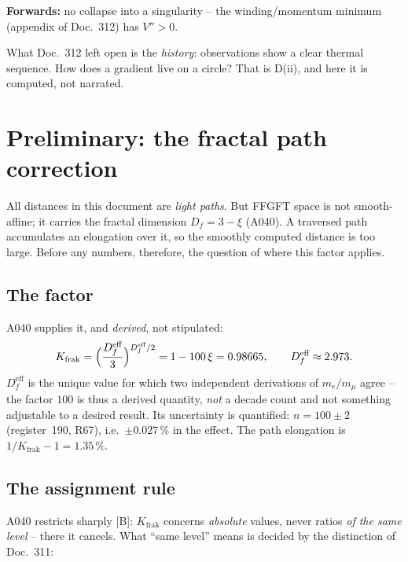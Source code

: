 \documentclass[11pt]{report}
\begin{document}
\textbf{Forwards:} no collapse into a singularity -- the
winding/momentum minimum (appendix of Doc.~312) has $V'' > 0$.

What Doc.~312 left open is the \emph{history}: observations show a
clear thermal sequence. How does a gradient live on a circle? That
is D(ii), and here it is computed, not narrated.

\chapter{Preliminary: the fractal path correction}

All distances in this document are \emph{light paths}. But FFGFT
space is not smooth-affine; it carries the fractal dimension
$D_f = 3-\xi$ (A040). A traversed path accumulates an elongation
over it, so the smoothly computed distance is too large. Before
any numbers, therefore, the question of where this factor applies.

\section{The factor}

A040 supplies it, and \emph{derived}, not stipulated:
\begin{equation}
  K_\text{frak} = \Bigl(\frac{D_f^\text{eff}}{3}\Bigr)^{D_f^\text{eff}/2}
  = 1-100\,\xi = 0.98665,
  \qquad D_f^\text{eff} \approx 2.973 .
\end{equation}
$D_f^\text{eff}$ is the unique value for which two independent
derivations of $m_e/m_\mu$ agree -- the factor $100$ is thus a
derived quantity, \emph{not} a decade count and not something
adjustable to a desired result. Its uncertainty is quantified:
$n = 100 \pm 2$ (register~190, R67), i.e.\ $\pm 0.027\,\%$ in
the effect. The path elongation is $1/K_\text{frak} - 1 = 1.35\,\%$.

\section{The assignment rule}

A040 restricts sharply [B]: $K_\text{frak}$ concerns
\emph{absolute} values, never ratios \emph{of the same level} --
there it cancels. What \enquote{same level} means is decided by
the distinction of Doc.~311:
\end{document}
